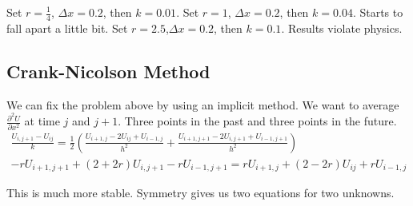 \documentclass[class=article,crop=false]{standalone}
\theoremstyle{plain}
\theoremstyle{remark}
\begin{document}
Set $r=\frac{1}{4}$, $\Delta x = 0.2$, then $k = 0.01$. 
Set $r=1$,  $\Delta x = 0.2$, then  $k = 0.04$. Starts to fall apart a little bit.
Set $r=2.5$,$\Delta x = 0.2$, then $k=0.1$. Results violate physics.

\subsection{Crank-Nicolson Method}
We can fix the problem above by using an implicit method. We want to average $\frac{\partial^2 U}{\partial {x}^2} $ at time  $j$ and $j+1$. Three points in the past and three points in the future.
 \begin{align*}
	 \frac{U_{i,j+1} -U_{ij} }{k} = \frac{1}{2} \left(  \frac{U_{i+1,j} - 2 U_{ij} + U_{i-1,j}}{h^2} +   \frac{U_{i+1,j+1} - 2 U_{i,j+1} + U_{i-1,j+1}}{h^2}  \right)  \\
	 -r U_{i+1,j+1}+(2+2r) U_{i,j+1} - r U_{i-1,j+1} = r U_{i+1,j} + (2-2r) U_{ij} + r U_{i-1,j}   	 	
\end{align*}

This is much more stable.
Symmetry gives us two equations for two unknowns.
\end{document}
